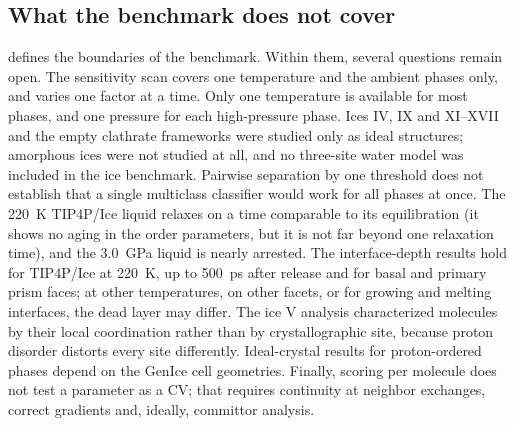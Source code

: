 \documentclass[11pt,a4paper]{article}
\begin{document}
\subsection{What the benchmark does not cover}
 defines the boundaries of the benchmark. Within them,
several questions remain open. The sensitivity scan covers one temperature
and the ambient phases only, and varies one factor at a time. Only one
temperature is available for most phases, and one pressure for each
high-pressure phase. Ices IV, IX and XI--XVII and the empty clathrate
frameworks were studied only as ideal structures; amorphous ices were not
studied at all, and no three-site water model was included in the ice benchmark. Pairwise
separation by one threshold does not establish that a single multiclass
classifier would work for all phases at once. The 220~K TIP4P/Ice liquid
relaxes on a time comparable to its equilibration (it shows no aging in the
order parameters, but it is not far beyond one relaxation time), and the
3.0~GPa liquid is nearly arrested. The interface-depth results hold for
TIP4P/Ice at 220~K, up to 500~ps after release and for basal and primary
prism faces; at other temperatures, on other facets, or for growing and
melting interfaces, the dead layer may differ. The ice V
analysis characterized molecules by their local coordination rather than by
crystallographic site, because proton disorder distorts every site
differently. Ideal-crystal results for proton-ordered phases depend on the
GenIce cell geometries. Finally, scoring per molecule does not test a parameter as a CV;
that requires continuity at neighbor exchanges, correct gradients and,
ideally, committor analysis.

\end{document}
